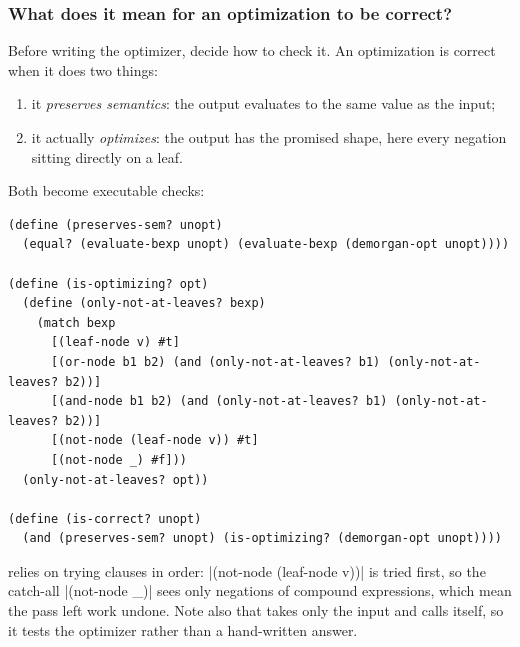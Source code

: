 \subsubsection{What does it mean for an optimization to be correct?} Before writing the optimizer, decide how to check it. An optimization is correct when it does two things:
\begin{enumerate}
  \item it \emph{preserves semantics}: the output evaluates to the same value as the input;
  \item it actually \emph{optimizes}: the output has the promised shape, here every negation sitting directly on a leaf.
\end{enumerate}
Both become executable checks:
\begin{lstlisting}
(define (preserves-sem? unopt)
  (equal? (evaluate-bexp unopt) (evaluate-bexp (demorgan-opt unopt))))

(define (is-optimizing? opt)
  (define (only-not-at-leaves? bexp)
    (match bexp
      [(leaf-node v) #t]
      [(or-node b1 b2) (and (only-not-at-leaves? b1) (only-not-at-leaves? b2))]
      [(and-node b1 b2) (and (only-not-at-leaves? b1) (only-not-at-leaves? b2))]
      [(not-node (leaf-node v)) #t]
      [(not-node _) #f]))
  (only-not-at-leaves? opt))

(define (is-correct? unopt)
  (and (preserves-sem? unopt) (is-optimizing? (demorgan-opt unopt))))
\end{lstlisting}
 relies on  trying clauses in order: \rkt|(not-node (leaf-node v))| is tried first, so the catch-all \rkt|(not-node _)| sees only negations of compound expressions, which mean the pass left work undone. Note also that  takes only the input and calls  itself, so it tests the optimizer rather than a hand-written answer.

